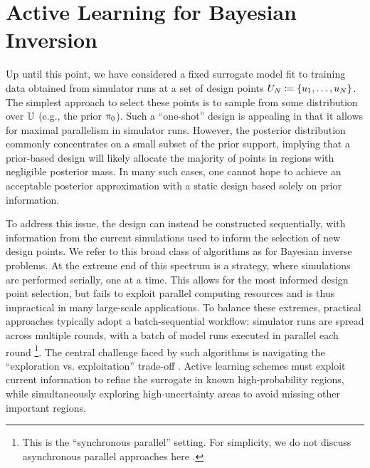 \documentclass[12pt]{article}
\begin{document}
\section{Active Learning for Bayesian Inversion} \label{sec:active-learning}
Up until this point, we have considered a fixed surrogate model fit to training data 
obtained from simulator runs at a set of design points $U_{N} \coloneqq \{u_1, \dots, u_{N}\}$.
The simplest approach to select these points is to sample from some distribution over $\mathbb{U}$
(e.g., the prior $\pi_0$). Such a ``one-shot'' design is appealing in that it allows for maximal 
parallelism in simulator runs. However, the posterior distribution commonly concentrates on a small 
subset of the prior support, implying that a prior-based 
design will likely allocate the majority of points in regions with negligible posterior mass.
In many such cases, one cannot hope to achieve an acceptable posterior approximation with 
a static design based solely on prior information. 

To address this issue, the design can instead be constructed 
sequentially, with information from the current simulations used to inform the selection of new design points.
We refer to this broad class of algorithms as  for Bayesian inverse problems.
At the extreme end of this spectrum is a  strategy, where simulations are performed serially, 
one at a time. This allows for the most informed design point selection, but fails to exploit parallel computing 
resources and is thus impractical in many large-scale applications.
To balance these extremes, practical approaches typically adopt a batch-sequential workflow: simulator runs are 
spread across multiple rounds, with a batch of model runs executed in parallel each round
\footnote{This is the ``synchronous parallel'' setting. 
For simplicity, we do not discuss asynchronous parallel approaches here \citep{parallelBOThompson}.}.
The central challenge faced by such algorithms is navigating the ``exploration vs. exploitation'' 
trade-off \citep{reviewBayesOpt,BadiaRL}. Active learning schemes must exploit current information 
to refine the surrogate in known high-probability regions, while simultaneously exploring high-uncertainty 
areas to avoid missing other important regions.
\end{document}
